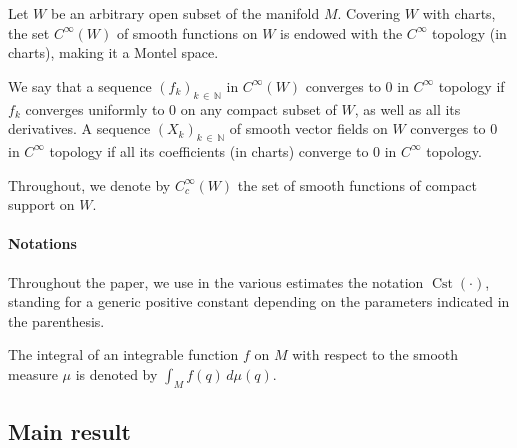 \documentclass[10pt]{amsart}
\theoremstyle{definition}\newtheorem{defi}[theo]{Definition}\newtheorem{rema}[theo]{Remark}\newtheorem{exam}[theo]{Example}\newtheorem{exem}[theo]{Example}\newtheorem{nota}[theo]{Notation}
\newcommand*\N{\mathbb{N}}
\DeclareMathOperator{\Cst}{Cst}
\begin{document}
Let $W$ be an arbitrary open subset of the manifold $M$. Covering $W$ with charts, the set $C^\infty(W)$ of smooth functions on $W$ is endowed with the $C^\infty$ topology (in charts), making it a Montel space.

We say that a sequence $(f_k)_{k\,\in\,\N}$ in $C^\infty(W)$ converges to $0$ in $C^\infty$ topology if $f_k$ converges uniformly to $0$ on any compact subset of $W$, as well as all its derivatives. A sequence $(X_k)_{k\,\in\,\N}$ of smooth vector fields on $W$ converges to $0$ in $C^\infty$ topology if all its coefficients (in charts) converge to $0$ in $C^\infty$ topology.

Throughout, we denote by $C_c^\infty(W)$ the set of smooth functions of compact support on $W$.

\goodbreak
\paragraph{Notations}
Throughout the paper, we use in the various estimates the notation $\Cst(\cdot)$, standing for a generic positive constant depending on the parameters indicated in the parenthesis.

The integral of an integrable function $f$ on $M$ with respect to the smooth measure $\mu$ is denoted by $\int_M f(q)\, d\mu(q)$.


\subsection{Main result}

\end{document}

